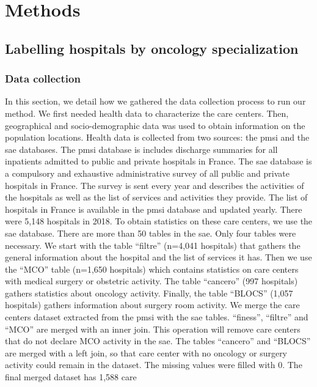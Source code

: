 \section{Methods}

\subsection{Labelling hospitals by oncology specialization}

\subsubsection{Data collection}

In this section, we detail how we gathered the data collection process to run
our method.  We first needed health data to characterize the care centers. Then,
geographical and socio-demographic data was used to obtain information on the
population locations. Health data is collected from two sources: the \ac{pmsi}
and the \ac{sae} databases. The \ac{pmsi} database is includes discharge
summaries for all inpatients admitted to public and private hospitals in France.
The \ac{sae} database is a compulsory and exhaustive administrative survey of
all public and private hospitals in France. The survey is sent every year and
describes the activities of the hospitals as well as the list of services and
activities they provide. The list of hospitals in France is available in the
\ac{pmsi} database and updated yearly. There were 5,148 hospitals in 2018. To
obtain statistics on these care centers, we use the \ac{sae} database. There are
more than 50 tables in the \ac{sae}. Only four tables were necessary. We start
with the table ``filtre'' (n=4,041 hospitals) that gathers the general
information about the hospital and the list of services it has. Then we use the
``MCO'' table (n=1,650 hospitals) which contains statistics on care centers with
medical surgery or obstetric activity. The table ``cancero'' (997 hospitals)
gathers statistics about oncology activity. Finally, the table ``BLOCS'' (1,057
hospitals) gathers information about surgery room activity. We merge the care
centers dataset extracted from the \ac{pmsi} with the \ac{sae} tables.
``finess'', ``filtre'' and ``MCO'' are merged with an inner join. This operation
will remove care centers that do not declare MCO activity in the \ac{sae}. The
tables ``cancero'' and ``BLOCS'' are merged with a left join, so that care
center with no oncology or surgery activity could remain in the dataset. The
missing values were filled with 0. The final merged dataset has 1,588 care
